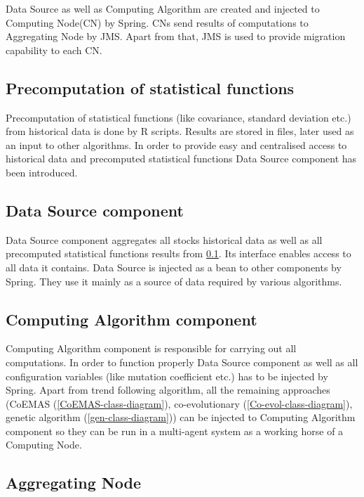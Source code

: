 Data Source as well as Computing Algorithm are created and injected to Computing Node(CN) by Spring. 
CNs send results of computations to Aggregating Node by JMS. 
Apart from that, JMS is used to provide migration capability to each CN.


\subsection{Precomputation of statistical functions}
\label{precompute}
Precomputation of statistical functions (like covariance, standard deviation etc.) from historical data is done by R scripts. 
Results are stored in files, later used as an input to other algorithms.
In order to provide easy and centralised access to historical data and precomputed statistical functions Data Source component has been introduced. 

\subsection{Data Source component}
\label{dataSource}

Data Source component aggregates all stocks historical data as well as all precomputed statistical functions results from \ref{precompute}.   
Its interface enables access to all data it contains. Data Source is injected as a bean to other components by Spring.
They use it mainly as a source of data required by various algorithms.

\subsection{Computing Algorithm component}

Computing Algorithm component is responsible for carrying out all computations.
In order to function properly Data Source component as well as all configuration variables (like mutation coefficient etc.) has to be injected by Spring.
Apart from trend following algorithm, all the remaining approaches (CoEMAS (\ref{CoEMAS-class-diagram}), co-evolutionary (\ref{Co-evol-class-diagram}),
 genetic algorithm (\ref{gen-class-diagram})) can be injected to Computing Algorithm component so they can be run
 in a multi-agent system as a working horse of a Computing Node.


\subsection{Aggregating Node}

